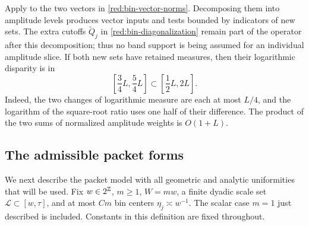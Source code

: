 Apply  to the two vectors in
\eqref{red:bin-vector-norms}. Decomposing them into amplitude levels
produces vector inputs and tests bounded by indicators of new sets.
The extra cutoffs \(\widetilde Q_j\) in
\eqref{red:bin-diagonalization} remain part of the operator after
this decomposition; thus no band support is being assumed for an
individual amplitude slice. If both new sets have retained measures,
then their logarithmic disparity is in
\begin{equation}\label{red:new-disparity}
 \left[\frac34L,\frac54L\right]
      \subset\left[\frac12L,2L\right].
\end{equation}
Indeed, the two changes of logarithmic measure are each at most
\(L/4\), and the logarithm of the square-root ratio uses one half
of their difference. The product of the two sums of normalized
amplitude weights is \(O(1+L)\).

\subsection{The admissible packet forms}

We next describe the packet model with all geometric and analytic
uniformities that will be used. Fix \(w\in2^{\mathbb Z}\), \(m\ge1\),
\(W=mw\), a finite dyadic scale set
\(\mathcal L\subset[w,\tau]\), and at most \(Cm\) bin centers
\(\eta_j\asymp w^{-1}\). The scalar case \(m=1\) just described
is included. Constants in this definition are fixed throughout.

